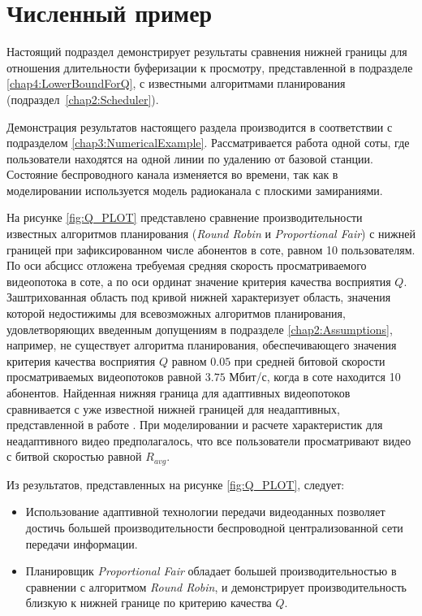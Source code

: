 \section{Численный пример}
\label{chap4:NumericalExample}

Настоящий подраздел демонстрирует результаты сравнения нижней границы для отношения длительности буферизации к просмотру, представленной в подразделе \ref{chap4:LowerBoundForQ}, с известными алгоритмами планирования (подраздел~\ref{chap2:Scheduler}).

Демонстрация результатов настоящего раздела производится в соответствии с подразделом \ref{chap3:NumericalExample}. Рассматривается работа одной соты, где пользователи находятся на одной линии по удалению от базовой станции. Состояние беспроводного канала изменяется во времени, так как в моделировании используется модель радиоканала с плоскими замираниями.

На рисунке \ref{fig:Q_PLOT} представлено сравнение производительности известных алгоритмов планирования (\textit{Round Robin} и \textit{Proportional Fair}) с нижней границей при зафиксированном числе абонентов в соте, равном 10 пользователям. По оси абсцисс отложена требуемая средняя скорость просматриваемого видеопотока в соте, а по оси ординат значение критерия качества восприятия $Q$. Заштрихованная область под кривой нижней характеризует область, значения которой недостижимы для всевозможных алгоритмов планирования, удовлетворяющих введенным допущениям в подразделе \ref{chap2:Assumptions}, например, не существует алгоритма планирования, обеспечивающего значения критерия качества восприятия $Q$ равном $0.05$ при средней битовой скорости просматриваемых видеопотоков равной $3.75$ Мбит/с, когда в соте находится 10 абонентов. Найденная нижняя граница для адаптивных видеопотоков сравнивается с уже известной нижней границей для неадаптивных, представленной в работе \cite{Bakin_Globecom}. При моделировании и расчете характеристик для неадаптивного видео предполагалось, что все пользователи просматривают видео с битвой скоростью равной $R_{avg}$.


Из результатов, представленных на рисунке \ref{fig:Q_PLOT}, следует:
\begin{itemize}
	\item Использование адаптивной технологии передачи видеоданных позволяет достичь большей производительности беспроводной централизованной сети передачи информации.
	\item Планировщик \textit{Proportional Fair} обладает большей производительностью в сравнении с алгоритмом \textit{Round Robin}, и демонстрирует производительность близкую к нижней границе по критерию качества $Q$.
\end{itemize}


